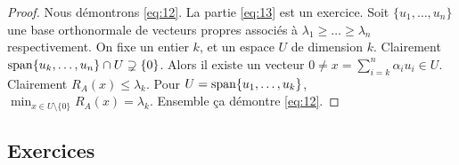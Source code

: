 \begin{proof}
Nous démontrons \eqref{eq:12}. La partie \eqref{eq:13} est un exercice. Soit $\{u_1,\dots,u_n\}$ une base orthonormale de vecteurs propres associés à $\lambda_1 ≥ \dots ≥ \lambda_n$ respectivement. On fixe un entier $k$, et un espace $U$ de dimension $k$. Clairement $\operatorname{span}\{u_k,\dots,u_n\} \cap U \supsetneq \{0\}$. Alors il existe un vecteur $0 \neq x = \sum_{i = k}^n \alpha_i u_i \in U$. Clairement $R_A(x) \leq \lambda_k$. Pour $U = \operatorname{span}\{u_1,\dots,u_k\}$, 
$
  \min_{x \in U \setminus \{0\}}  R_A(x) = \lambda_k.
$ Ensemble ça démontre \eqref{eq:12}. 
\end{proof}



\subsection*{Exercices}

